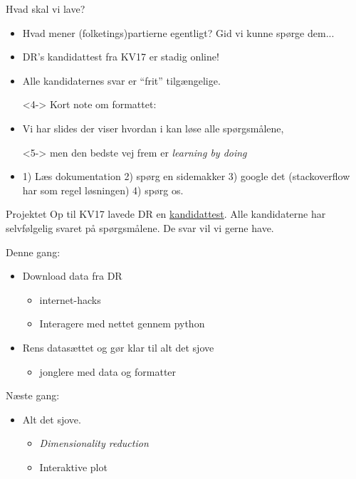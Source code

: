 \documentclass[10pt]{beamer}
\begin{document}
\begin{frame}[fragile]{Hvad skal vi lave?}
\begin{itemize}
  \item<1-> Hvad mener (folketings)partierne egentligt? Gid vi kunne spørge dem...
  \item<2-> DR's kandidattest fra KV17 er stadig online!
  \item<3-> Alle kandidaternes svar er ``frit'' tilgængelige.
  \item[]
  \item[]<4-> Kort note om formattet:
  \item<4-> Vi har slides der viser hvordan i kan løse alle spørgsmålene,
  \item[]<5-> men den bedste vej frem er \textit{learning by doing}
  \item<6-> 1) Læs dokumentation 2) spørg en sidemakker 3) google det (stackoverflow har som regel løsningen) 4) spørg os.
\end{itemize}


\end{frame}

\begin{frame}[fragile]{Projektet}
Op til KV17 lavede DR en \href{https://www.dr.dk/nyheder/politik/kv17/kandidat-testen}{kandidattest}. Alle kandidaterne har selvfølgelig svaret på spørgsmålene. De svar vil vi gerne have.

Denne gang:
\begin{itemize}
  \item Download data fra DR
  \begin{itemize}
    \item internet-hacks
    \item Interagere med nettet gennem python
  \end{itemize}
  \item Rens datasættet og gør klar til alt det sjove
  \begin{itemize}
    \item jonglere med data og formatter
  \end{itemize}
\end{itemize}

Næste gang:
\begin{itemize}
  \item Alt det sjove.
  \begin{itemize}
    \item \textit{Dimensionality reduction}
    \item Interaktive plot
  \end{itemize}
\end{itemize}
\end{frame}
\end{document}
